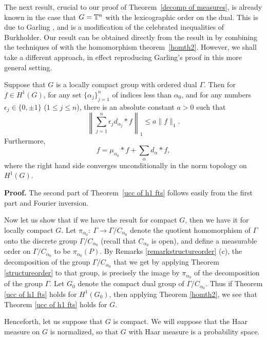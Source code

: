 \documentclass[12pt,leqno]{article}
\def\T{\Bbb T}
\begin{document}
The next result, crucial to our proof of Theorem~\ref{decomp of measures},
is already known in the case that $G = \T^n$ with the lexicographic order
on the dual.  This is due to Garling \cite{gar}, and is a modification
of the celebrated inequalities of Burkholder.
Our result
can be obtained directly from the result in \cite{gar} 
by combining the techniques of
\cite{ams3} with the homomorphism theorem~\ref{homth2}.  However, we shall
take a different approach, in effect reproducing Garling's proof in this
more general setting.

\begin{thm}
\label{ucc of h1 fts}
Suppose that $G$ is a locally compact group with ordered dual $\Gamma$.  
Then for
$f\in H^1(G)$, for any set $\{\alpha_j\}_{j=1}^n$ of indices
less than $\alpha_0$, and
for any numbers $\epsilon_j \in \{0,\pm 1\}$ ($1 \le j \le n$),
there is an absolute constant $a>0$ such that
\begin{equation}\label{34}
\left\|
\sum_{j=1}^n
\epsilon_j d_{\alpha_j} *f
\right\|_1
\leq a \|f\|_1.
\end{equation}
Furthermore, 
\begin{equation}
\label{ucc of h1 equation}
f = \mu_{\alpha_0}*f + \sum_\alpha d_\alpha*f,
\end{equation}
where the right hand side converges unconditionally in the norm topology on
$H^1(G)$.
\end{thm}
%
{\bf Proof.}
The second part of Theorem~\ref{ucc of h1 fts} follows easily
from the first part and Fourier inversion.

Now let us show that if we have the result for compact $G$, then
we have it for locally compact $G$.
Let $\pi_{\alpha_0} :\ \Gamma\rightarrow 
\Gamma/C_{\alpha_0}$ denote the quotient homomorphism
of $\Gamma$ onto the discrete group $\Gamma/C_{\alpha_0}$ 
(recall that $C_{\alpha_0}$ is open),
and define a measurable order on 
$\Gamma/C_{\alpha_0}$ to be $\pi_{\alpha_0}(P)$.  
By Remarks \ref{remarkstructureorder} (c),
the decomposition of the group $\Gamma/C_{\alpha_0}$ that we get
by applying Theorem \ref{structureorder}
to that group, is precisely the 
image by $\pi_{\alpha_0}$ of the decomposition of the group $\Gamma$.  
Let $G_0$ denote the 
compact dual group of $\Gamma/C_{\alpha_0}$.  Thus if
Theorem \ref{ucc of h1 fts} holds for $ H^1(G_0)$, then
applying Theorem \ref{homth2}, we see that 
Theorem \ref{ucc of h1 fts} holds for $G$.

Henceforth, let us suppose that $G$ is compact.
We will suppose that the Haar measure on $G$ is normalized, so
that $G$ with Haar measure is a probability space.  
\end{document}

